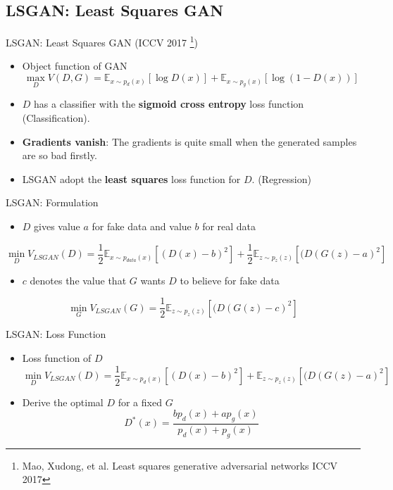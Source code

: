 \documentclass[handout]{beamer}
\begin{document}
\subsection{LSGAN: Least Squares GAN}

\begin{frame}[<+->]{LSGAN: Least Squares GAN (ICCV 2017 \footnote{Mao, Xudong, et al. Least squares generative adversarial networks ICCV 2017})}
	\begin{itemize}
		\item Object function of GAN
		$$\max_D V(D, G) = \mathbb{E}_{x \sim p_{d}(x)}[\log D(x)] + \mathbb{E}_{x \sim p_g(x)}[\log (1 - D(x))]$$
	\end{itemize}
	\begin{itemize}
		\item \(D\) has a classifier with the \textbf{sigmoid cross entropy} loss function (Classification).
		\item \textbf{Gradients vanish}: The gradients is quite small when the generated samples are so bad firstly.
		\item LSGAN adopt the \textbf{least squares} loss function for \(D\). (Regression)
	\end{itemize}
\end{frame}

\begin{frame}[<+->]{LSGAN: Formulation}
	\begin{itemize}
		\item \(D\) gives value \(a\) for fake data and value \(b\) for real data
	\end{itemize}
	\begin{actionenv}
		$$\min_D V_{LSGAN}(D) = \frac{1}{2} \mathbb{E}_{x \sim p_{data}(x)}[(D(x)-b)^2] +  \frac{1}{2} \mathbb{E}_{z \sim p_z(z)}[(D(G(z)-a)^2]$$
	\end{actionenv}
	\begin{itemize}
		\item \(c\) denotes the value that \(G\) wants \(D\) to believe for fake data
	\end{itemize}
	\begin{actionenv}
		$$\min_G V_{LSGAN}(G) = \frac{1}{2} \mathbb{E}_{z \sim p_z(z)}[(D(G(z)-c)^2]$$		
	\end{actionenv}
\end{frame}

\begin{frame}[<+->]{LSGAN: Loss Function}
	\begin{itemize}
		\item Loss function of \(D\)
		$$\min_D V_{LSGAN}(D) = \frac{1}{2} \mathbb{E}_{x \sim p_{d}(x)}[(D(x)-b)^2] +  \mathbb{E}_{z \sim p_z(z)}[(D(G(z)-a)^2]$$
	\end{itemize}
	\begin{itemize}
		\item Derive the optimal \(D\) for a fixed \(G\)
		$$D^*(x) = \frac{b p_{d}(x)+a p_g(x)}{p_{d}(x)+p_g(x)}$$
	\end{itemize}
\end{frame}
\end{document}
